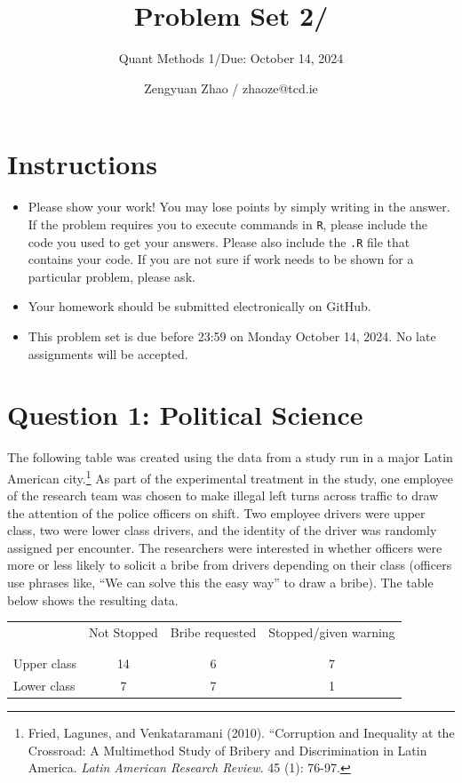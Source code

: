 \documentclass[12pt,letterpaper]{article}
\title{Problem Set 2/}
\date{Zengyuan Zhao / zhaoze@tcd.ie}
\author{Quant Methods 1/Due: October 14, 2024}
\begin{document}
	\maketitle
	\section*{Instructions}
\begin{itemize}
	\item Please show your work! You may lose points by simply writing in the answer. If the problem requires you to execute commands in \texttt{R}, please include the code you used to get your answers. Please also include the \texttt{.R} file that contains your code. If you are not sure if work needs to be shown for a particular problem, please ask.
	\item Your homework should be submitted electronically on GitHub.
	\item This problem set is due before 23:59 on Monday October 14, 2024. No late assignments will be accepted.

\end{itemize}

	
	\vspace{.5cm}
	\section*{Question 1: Political Science}
		\vspace{.25cm}
	The following table was created using the data from a study run in a major Latin American city.\footnote{Fried, Lagunes, and Venkataramani (2010). ``Corruption and Inequality at the Crossroad: A Multimethod Study of Bribery and Discrimination in Latin America. \textit{Latin American Research Review}. 45 (1): 76-97.} As part of the experimental treatment in the study, one employee of the research team was chosen to make illegal left turns across traffic to draw the attention of the police officers on shift. Two employee drivers were upper class, two were lower class drivers, and the identity of the driver was randomly assigned per encounter. The researchers were interested in whether officers were more or less likely to solicit a bribe from drivers depending on their class (officers use phrases like, ``We can solve this the easy way'' to draw a bribe). The table below shows the resulting data.

\newpage
\begin{table}[h!]
	\centering
	\begin{tabular}{l | c c c }
		& Not Stopped & Bribe requested & Stopped/given warning \\
		\\[-1.8ex] 
		\hline \\[-1.8ex]
		Upper class & 14 & 6 & 7 \\
		Lower class & 7 & 7 & 1 \\
		\hline
	\end{tabular}
\end{table}
\end{document}
